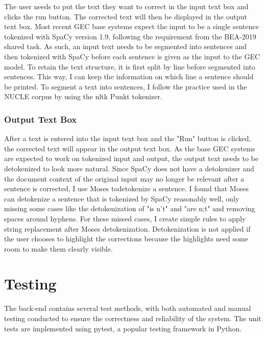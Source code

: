 The user needs to put the text they want to correct in the input text box and clicks the run button.
The corrected text will then be displayed in the output text box.
Most recent GEC base systems expect the input to be a single sentence tokenized with SpaCy version 1.9, following the requirement from the BEA-2019 shared task.
As such, an input text needs to be segmented into sentences and then tokenized with SpaCy before each sentence is given as the input to the GEC model.
To retain the text structure, it is first split by line before segmented into sentences.
This way, I can keep the information on which line a sentence should be printed.
To segment a text into sentences, I follow the practice used in the NUCLE corpus by using the nltk Punkt
tokenizer.

\subsubsection{Output Text Box}

After a text is entered into the input text box and the "Run" button is clicked, the corrected text will appear in the output text box.
As the base GEC systems are expected to work on tokenized input and output, the output text needs to be detokenized to look more natural.
Since SpaCy does not have a detokenizer and the document context of the original input may no longer be relevant after a sentence is corrected, I use Moses todetokenize a sentence.
I found that Moses can detokenize a sentence that is tokenized by SpaCy reasonably well, only missing some cases like the detokenization of "is n't" and "are n;t" and removing spaces around hyphens.
For these missed cases, I create simple rules to apply string replacement after Moses detokenization.
Detokenization is not applied if the user chooses to highlight the corrections because the highlights need some room to make them clearly visible.

\section{Testing}

The back-end contains several test methods, with both automated and manual testing conducted to ensure the correctness and reliability of the system.
The unit tests are implemented using pytest, a popular testing framework in Python.

%

